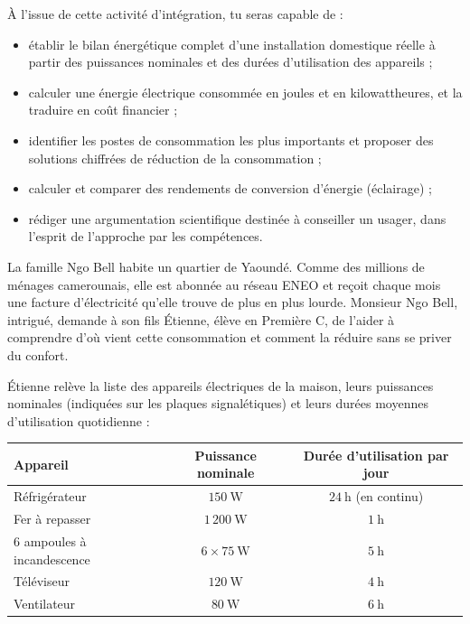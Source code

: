 \documentclass[11pt]{article}
\newcommand{\cle}[1]{{\popxbold\color{popdark}#1}}
\newcounter{popsec}
\newcounter{popsub}
\newcommand{\courssub}[1]{%
  \stepcounter{popsub}%
  \par\vspace{9pt}\noindent{\popxbold\fontsize{11.5}{13}\selectfont\color{popink}{\color{poporange}\thepopsec.\thepopsub}\hspace{6pt}#1}\par\nopagebreak\vspace{4pt}
}
\begin{document}
À l'issue de cette activité d'intégration, tu seras capable de :

\begin{itemize}
\item établir le \cle{bilan énergétique} complet d'une installation domestique réelle à partir des puissances nominales et des durées d'utilisation des appareils ;
\item calculer une \cle{énergie électrique} consommée en joules et en kilowattheures, et la traduire en coût financier ;
\item identifier les postes de consommation les plus importants et proposer des solutions chiffrées de réduction de la consommation ;
\item calculer et comparer des \cle{rendements} de conversion d'énergie (éclairage) ;
\item rédiger une argumentation scientifique destinée à conseiller un usager, dans l'esprit de l'approche par les compétences.
\end{itemize}

\courssub{Situation}

La famille Ngo Bell habite un quartier de Yaoundé. Comme des millions de ménages camerounais, elle est abonnée au réseau ENEO et reçoit chaque mois une facture d'électricité qu'elle trouve de plus en plus lourde. Monsieur Ngo Bell, intrigué, demande à son fils Étienne, élève en Première C, de l'aider à comprendre d'où vient cette consommation et comment la réduire sans se priver du confort.

Étienne relève la liste des appareils électriques de la maison, leurs puissances nominales (indiquées sur les plaques signalétiques) et leurs durées moyennes d'utilisation quotidienne :

\begin{center}
\begin{tabular}{|l|c|c|}
\hline
\rowcolor{popblueL} \textbf{Appareil} & \textbf{Puissance nominale} & \textbf{Durée d'utilisation par jour} \\
\hline
Réfrigérateur & $150~\mathrm{W}$ & $24~\mathrm{h}$ (en continu) \\
\hline
Fer à repasser & $1\,200~\mathrm{W}$ & $1~\mathrm{h}$ \\
\hline
6 ampoules à incandescence & $6 \times 75~\mathrm{W}$ & $5~\mathrm{h}$ \\
\hline
Téléviseur & $120~\mathrm{W}$ & $4~\mathrm{h}$ \\
\hline
Ventilateur & $80~\mathrm{W}$ & $6~\mathrm{h}$ \\
\hline
\end{tabular}
\end{center}
\end{document}
